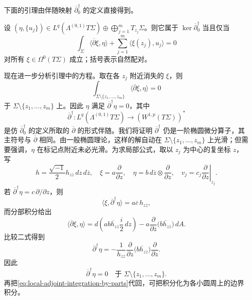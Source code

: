 下面的引理由伴随映射 $\overline\partial_0^\dagger$ 的定义直接得到。

\begin{lemma}\label{lem:kernel-adjoint-pairing}
设
$(\eta,\{u_j\})\in L^q(\Lambda^{(0,1)}T\Sigma)
\oplus\bigoplus_{j=1}^mT_{z_j}\Sigma$。则它属于
$\ker\overline\partial_0^\dagger$ 当且仅当
\[
 \int_\Sigma\langle\overline\partial\xi,\eta\rangle
 +\sum_{j=1}^m\langle\xi(z_j),u_j\rangle=0
\]
对所有 $\xi\in\Omega^0(T\Sigma)$ 成立；括号表示自然配对。
\end{lemma}

现在进一步分析引理中的方程。取在各 $z_j$ 附近消失的 $\xi$，则
\[
 \int_{\Sigma\setminus\{z_1,\ldots,z_m\}}
 \langle\overline\partial\xi,\eta\rangle=0
\]
于 $\Sigma\setminus\{z_1,\ldots,z_m\}$ 上。因此 $\eta$ 满足
$\overline\partial^\dagger\eta=0$，其中
\[
 \overline\partial^\dagger:
 L^q(\Lambda^{(0,1)}T\Sigma)\longrightarrow(W^{1,p}(T\Sigma))^*
\]
是仿 $\overline\partial_0^\dagger$ 的定义所取的 $\overline\partial$ 的形式伴随。我们将证明
$\overline\partial^\dagger$ 仍是一阶椭圆微分算子，其主符号与 $\overline\partial$ 相同。由一般椭圆理论，这样的解自动在
$\Sigma\setminus\{z_1,\ldots,z_m\}$ 上光滑；但需要强调，$\eta$ 在标记点附近未必光滑。为求局部公式，取以 $z_j$ 为中心的复坐标 $z$，写
\[
 h=\frac{\sqrt{-1}}2h_{z\overline z}\,dz\,d\overline z,
 \quad
 \xi=a\frac\partial{\partial z},\quad
 \eta=b\,d\overline z\otimes\frac\partial{\partial z},\quad
 v_j=c_j\left.\frac\partial{\partial z}\right|_{z_j}.
\]
若 $\overline\partial^\dagger\eta=c\,\partial/\partial z$，则
\begin{equation}
 \langle\xi,\overline\partial^\dagger\eta\rangle
 =a\overline c\,h_{z\overline z},
 \label{eq:local-adjoint-pairing}
\end{equation}
而分部积分给出
\begin{equation}
 \langle\overline\partial\xi,\eta\rangle
 =d\!\left(a\overline{b h_{z\overline z}}\frac{i}{2}\,dz\right)
 -a\frac\partial{\partial\overline z}
 \bigl(\overline{b h_{z\overline z}}\bigr)\,dA.
 \label{eq:local-adjoint-integration-by-parts}
\end{equation}
比较二式得到
\[
 \overline\partial^\dagger\eta
 =-\frac1{h_{z\overline z}}
 \frac\partial{\partial z}\bigl(\overline{b h_{z\overline z}}\bigr)
 \frac\partial{\partial z}.
\]
因此
\begin{equation}
 \overline\partial^\dagger\eta=0
 \quad\text{于 }\Sigma\setminus\{z_1,\ldots,z_m\}.
 \label{eq:adjoint-zero-away-marked-points}
\end{equation}
再把\eqref{eq:local-adjoint-integration-by-parts}代回，可把积分化为各小圆周上的边界积分。


